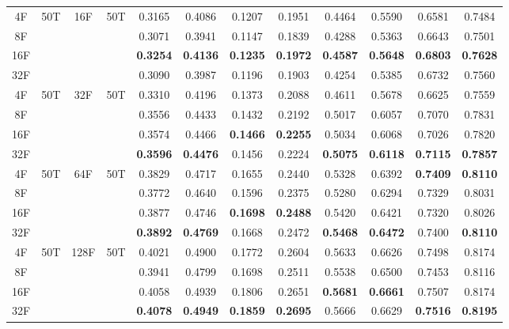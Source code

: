 \begin{table}[t]
\begin{tabular}{@{}c@{\hspace{3pt}}c@{\hspace{6pt}}c@{\hspace{3pt}}c@{\hspace{6pt}}*{7}{c@{\hspace{3pt}}}c@{}}
\midrule
4F  & \multirow{4}{*}{50T} & \multirow{4}{*}{16F} & \multirow{4}{*}{50T} & 0.3165 & 0.4086 & 0.1207 & 0.1951 & 0.4464 & 0.5590 & 0.6581 & 0.7484 \\
8F  & & & & 0.3071 & 0.3941 & 0.1147 & 0.1839 & 0.4288 & 0.5363 & 0.6643 & 0.7501 \\
16F & & & & \textbf{0.3254} & \textbf{0.4136} & \textbf{0.1235} & \textbf{0.1972} & \textbf{0.4587} & \textbf{0.5648} & \textbf{0.6803} & \textbf{0.7628} \\
32F & & & & 0.3090 & 0.3987 & 0.1196 & 0.1903 & 0.4254 & 0.5385 & 0.6732 & 0.7560 \\
\midrule
4F  & \multirow{4}{*}{50T} & \multirow{4}{*}{32F} & \multirow{4}{*}{50T} & 0.3310 & 0.4196 & 0.1373 & 0.2088 & 0.4611 & 0.5678 & 0.6625 & 0.7559 \\
8F  & & & & 0.3556 & 0.4433 & 0.1432 & 0.2192 & 0.5017 & 0.6057 & 0.7070 & 0.7831 \\
16F & & & & 0.3574 & 0.4466 & \textbf{0.1466} & \textbf{0.2255} & 0.5034 & 0.6068 & 0.7026 & 0.7820 \\
32F & & & & \textbf{0.3596} & \textbf{0.4476} & 0.1456 & 0.2224 & \textbf{0.5075} & \textbf{0.6118} & \textbf{0.7115} & \textbf{0.7857} \\
\midrule
4F  & \multirow{4}{*}{50T} & \multirow{4}{*}{64F} & \multirow{4}{*}{50T} & 0.3829 & 0.4717 & 0.1655 & 0.2440 & 0.5328 & 0.6392 & \textbf{0.7409} & \textbf{0.8110} \\
8F  & & & & 0.3772 & 0.4640 & 0.1596 & 0.2375 & 0.5280 & 0.6294 & 0.7329 & 0.8031 \\
16F & & & & 0.3877 & 0.4746 & \textbf{0.1698} & \textbf{0.2488} & 0.5420 & 0.6421 & 0.7320 & 0.8026 \\
32F & & & & \textbf{0.3892} & \textbf{0.4769} & 0.1668 & 0.2472 & \textbf{0.5468} & \textbf{0.6472} & 0.7400 & \textbf{0.8110} \\
\midrule
4F  & \multirow{4}{*}{50T} & \multirow{4}{*}{128F} & \multirow{4}{*}{50T} & 0.4021 & 0.4900 & 0.1772 & 0.2604 & 0.5633 & 0.6626 & 0.7498 & 0.8174 \\
8F  & & & & 0.3941 & 0.4799 & 0.1698 & 0.2511 & 0.5538 & 0.6500 & 0.7453 & 0.8116 \\
16F & & & & 0.4058 & 0.4939 & 0.1806 & 0.2651 & \textbf{0.5681} & \textbf{0.6661} & 0.7507 & 0.8174 \\
32F & & & & \textbf{0.4078} & \textbf{0.4949} & \textbf{0.1859} & \textbf{0.2695} & 0.5666 & 0.6629 & \textbf{0.7516} & \textbf{0.8195} \\

\end{tabular}
\end{table}
